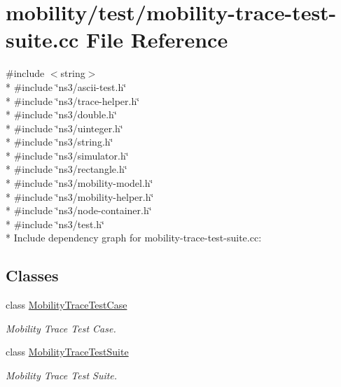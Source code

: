 \hypertarget{mobility-trace-test-suite_8cc}{}\section{mobility/test/mobility-\/trace-\/test-\/suite.cc File Reference}
\label{mobility-trace-test-suite_8cc}
{\ttfamily \#include $<$string$>$}\\*
{\ttfamily \#include \char`\"{}ns3/ascii-\/test.\+h\char`\"{}}\\*
{\ttfamily \#include \char`\"{}ns3/trace-\/helper.\+h\char`\"{}}\\*
{\ttfamily \#include \char`\"{}ns3/double.\+h\char`\"{}}\\*
{\ttfamily \#include \char`\"{}ns3/uinteger.\+h\char`\"{}}\\*
{\ttfamily \#include \char`\"{}ns3/string.\+h\char`\"{}}\\*
{\ttfamily \#include \char`\"{}ns3/simulator.\+h\char`\"{}}\\*
{\ttfamily \#include \char`\"{}ns3/rectangle.\+h\char`\"{}}\\*
{\ttfamily \#include \char`\"{}ns3/mobility-\/model.\+h\char`\"{}}\\*
{\ttfamily \#include \char`\"{}ns3/mobility-\/helper.\+h\char`\"{}}\\*
{\ttfamily \#include \char`\"{}ns3/node-\/container.\+h\char`\"{}}\\*
{\ttfamily \#include \char`\"{}ns3/test.\+h\char`\"{}}\\*
Include dependency graph for mobility-\/trace-\/test-\/suite.cc\+:
\subsection*{Classes}
\begin{DoxyCompactItemize}
\item 
class \hyperlink{classMobilityTraceTestCase}{Mobility\+Trace\+Test\+Case}
\begin{DoxyCompactList}\small\item\em Mobility Trace Test Case. \end{DoxyCompactList}\item 
class \hyperlink{classMobilityTraceTestSuite}{Mobility\+Trace\+Test\+Suite}
\begin{DoxyCompactList}\small\item\em Mobility Trace Test Suite. \end{DoxyCompactList}\end{DoxyCompactItemize}
